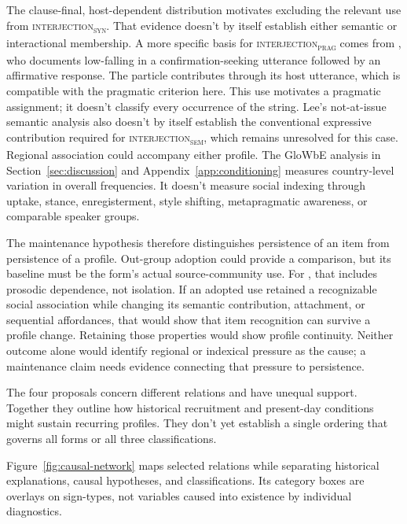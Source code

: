 \documentclass[12pt]{article}
\newcommand{\intj}[1]{\textsc{interjection\textsubscript{#1}}}
\begin{document}
The clause-final, host-dependent distribution motivates excluding the relevant  use from \intj{syn}. That evidence doesn't by itself establish either semantic or interactional membership. A more specific basis for \intj{prag} comes from \textcite[§1, example~3]{lee2022lah}, who documents low-falling  in a confirmation-seeking utterance followed by an affirmative response. The particle contributes through its host utterance, which is compatible with the pragmatic criterion here. This use motivates a pragmatic assignment; it doesn't classify every occurrence of the string. Lee's not-at-issue semantic analysis also doesn't by itself establish the conventional expressive contribution required for \intj{sem}, which remains unresolved for this case. Regional association could accompany either profile. The GloWbE analysis in Section~\ref{sec:discussion} and Appendix~\ref{app:conditioning} measures country-level variation in overall frequencies. It doesn't measure social indexing through uptake, stance, enregisterment, style shifting, metapragmatic awareness, or comparable speaker groups.

The maintenance hypothesis therefore distinguishes persistence of an item from persistence of a profile. Out-group adoption could provide a comparison, but its baseline must be the form's actual source-community use. For , that includes prosodic dependence, not isolation. If an adopted use retained a recognizable social association while changing its semantic contribution, attachment, or sequential affordances, that would show that item recognition can survive a profile change. Retaining those properties would show profile continuity. Neither outcome alone would identify regional or indexical pressure as the cause; a maintenance claim needs evidence connecting that pressure to persistence.

The four proposals concern different relations and have unequal support. Together they outline how historical recruitment and present-day conditions might sustain recurring profiles. They don't yet establish a single ordering that governs all forms or all three classifications.

Figure~\ref{fig:causal-network} maps selected relations while separating historical explanations, causal hypotheses, and classifications. Its category boxes are overlays on sign-types, not variables caused into existence by individual diagnostics.
\end{document}
